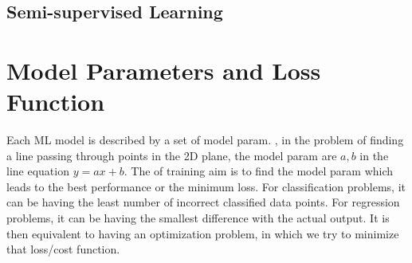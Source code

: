 \subsection{Semi-supervised Learning}

\section{Model Parameters and Loss Function}
\label{sec:model-param-loss}
Each \ac{ML} model is described by a set of model \ac{param}. \Eg, in the problem of finding a line passing through points in the 2D plane, the model \ac{param} are $a, b$ in the line equation $y=ax+b$. The of training aim is to find the model \ac{param} which leads to the best performance or the minimum loss. For classification problems, it can be having the least number of incorrect classified data points. For regression problems, it can be having the smallest difference with the actual output. It is then equivalent to having an optimization problem, in which we try to minimize that loss/cost function.
